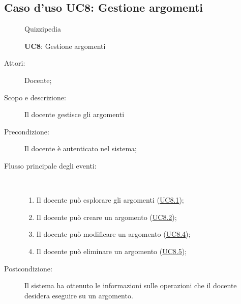 \subsection{Caso d'uso UC8: Gestione argomenti}
	\begin{figure}[H]
		\centering
		\begin{resizedtikzpicture}{\textwidth}
		\begin{umlsystem}[x=0, fill=lightgray!20]{Quizzipedia}
		\end{umlsystem}
		\end{resizedtikzpicture}
		\caption{\textbf{UC8}: Gestione argomenti}
		\label{UC8}
	\end{figure}
\begin{description}
\item[Attori:] Docente;
\item[Scopo e descrizione:] Il docente gestisce gli argomenti
      \item[Precondizione:] Il docente è autenticato nel sistema;

        \item[Flusso principale degli eventi:] \ 
 \begin{enumerate}
          \item Il docente può esplorare gli argomenti (\hyperlink{UC8.1}{UC8.1});
          \item Il docente può creare un argomento (\hyperlink{UC8.2}{UC8.2});
          \item Il docente può modificare un argomento (\hyperlink{UC8.4}{UC8.4});
          \item Il docente può eliminare un argomento (\hyperlink{UC8.5}{UC8.5});

      \end{enumerate}
    \item[Postcondizione:] Il sistema ha ottenuto le informazioni sulle operazioni che il docente desidera eseguire su un argomento.
  \end{description}
\hypertarget{UC8.1}{}
